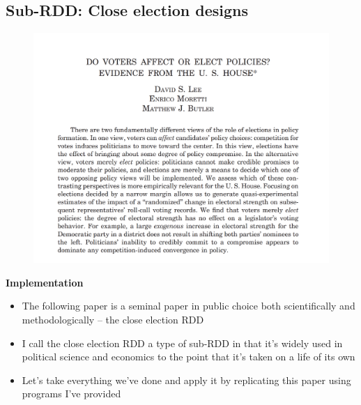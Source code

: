 \documentclass[notes=show]{beamer}
\begin{document}
\subsection{Sub-RDD: Close election designs}

\begin{frame}

	\begin{figure}
	\includegraphics[scale=0.15]{./lecture_includes/lmb_qje.png}
	\end{figure}

\end{frame}


		
\begin{frame}[plain]
\begin{center}
\textbf{Implementation}
\end{center}

\begin{itemize}
\item The following paper is a seminal paper in public choice both scientifically and methodologically -- the close election RDD
\item I call the close election RDD a type of sub-RDD in that it's widely used in political science and economics to the point that it's taken on a life of its own
\item Let's take everything we've done and apply it by replicating this paper using programs I've provided
\end{itemize}

\end{frame}
\end{document}
